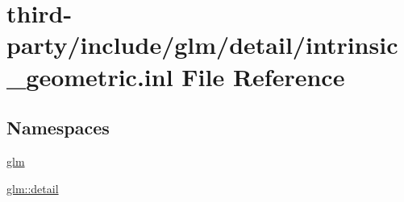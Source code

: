 \hypertarget{intrinsic__geometric_8inl}{}\section{third-\/party/include/glm/detail/intrinsic\+\_\+geometric.inl File Reference}
\label{intrinsic__geometric_8inl}
\subsection*{Namespaces}
\begin{DoxyCompactItemize}
\item 
 \hyperlink{namespaceglm}{glm}
\item 
 \hyperlink{namespaceglm_1_1detail}{glm\+::detail}
\end{DoxyCompactItemize}
